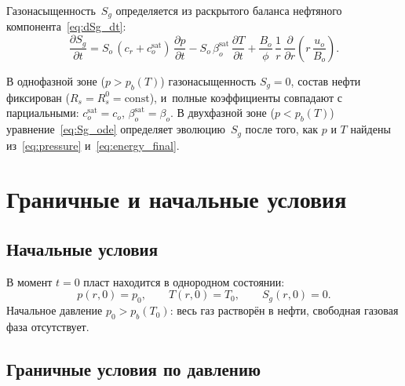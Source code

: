 \documentclass[12pt,a4paper]{article}
\begin{document}
Газонасыщенность~$S_g$ определяется из раскрытого баланса нефтяного
компонента~\eqref{eq:dSg_dt}:
\begin{equation}\label{eq:Sg_ode}
  \frac{\partial S_g}{\partial t}
  = S_o\,(c_r + c_o^{\mathrm{sat}})\,\frac{\partial p}{\partial t}
    - S_o\,\beta_o^{\mathrm{sat}}\,\frac{\partial T}{\partial t}
    + \frac{B_o}{\phi}\,\frac{1}{r}\,\frac{\partial}{\partial r}\!
      \left(r\,\frac{u_o}{B_o}\right).
\end{equation}

В однофазной зоне ($p > p_b(T)$) газонасыщенность $S_g = 0$,
состав нефти фиксирован ($R_s = R_s^0 = \mathrm{const}$), и~полные
коэффициенты совпадают с парциальными:
$c_o^{\mathrm{sat}} = c_o$, $\beta_o^{\mathrm{sat}} = \beta_o$.
В двухфазной зоне ($p < p_b(T)$) уравнение~\eqref{eq:Sg_ode} определяет
эволюцию~$S_g$ после того, как $p$ и $T$ найдены из~\eqref{eq:pressure}
и~\eqref{eq:energy_final}.


\section{Граничные и начальные условия}\label{sec:bc_ic}

\subsection{Начальные условия}\label{ssec:ic}

В момент $t = 0$ пласт находится в однородном состоянии:
\begin{equation}\label{eq:ic}
  p(r, 0) = p_0, \qquad T(r, 0) = T_0, \qquad S_g(r, 0) = 0.
\end{equation}
Начальное давление $p_0 > p_b(T_0)$: весь газ растворён в нефти,
свободная газовая фаза отсутствует.

\subsection{Граничные условия по давлению}\label{ssec:bc_p}
\end{document}
